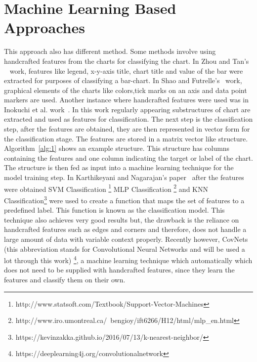 \documentclass[12pt, a4paper,oneside]{report}
\begin{document}
\section{Machine Learning Based Approaches}
This approach also has different method. Some methods 
involve using handcrafted features from the charts for classifying the chart. In Zhou and Tan's ~\cite{zhou2000bar} work, features like legend, x-y-axis title, chart title and value of the bar were extracted for purposes of classifying a bar-chart. In Shao and  Futrelle's~\cite{shao2005recognition} work, graphical elements of the charts like colors,tick marks on an axis and data point markers are used. Another instance where handcrafted features were used was in Inokuchi et al. work~\cite{inokuchi2000apriori}. In this work regularly appearing substructures of chart are extracted and used as features for classification. The next step is the classification step, after the features are obtained, they are then represented in vector form for the classification stage. The features are stored in a matrix vector like structure. Algorithm~\ref{alg:1} shows an example structure. This structure has columns containing the features and one column indicating the target or label of the chart. The structure is then fed as input into a machine learning technique for the model training step. In Karthikeyani and Nagarajan's paper~\cite{karthikeyani2012machine} after the features were obtained SVM Classification \footnote{http://www.statsoft.com/Textbook/Support-Vector-Machines} MLP Classification
\footnote{http://www.iro.umontreal.ca/~bengioy/ift6266/H12/html/mlp\_en.html} and  KNN Classification\footnote{
https://kevinzakka.github.io/2016/07/13/k-nearest-neighbor/} were used to create a function that maps the set of features to a predefined label. This function is known as the classification model. This technique also achieves very good results but, the drawback is the reliance on handcrafted features such as edges and corners and therefore, does not handle a large amount of data with variable context properly. Recently however, CovNets (this abbreviation stands for Convolutional Neural Networks and will be used a lot through this work) \footnote{https://deeplearning4j.org/convolutionalnetwork}, a machine learning technique which automatically which does not need to be supplied with handcrafted features, since they learn the features and classify them on their own.
\end{document}
